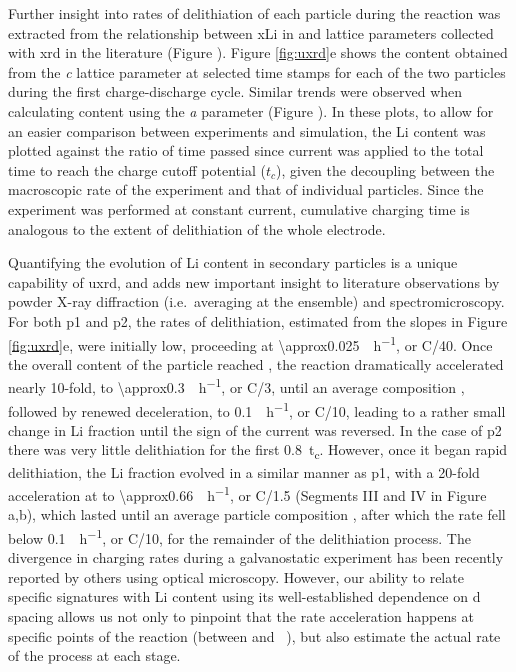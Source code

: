 \documentclass{WileyMSP-template}
\begin{document}
\newpage %
Further insight into rates of delithiation of each particle during the
reaction was extracted from the relationship between \gls{xLi} in
 and lattice parameters collected with \gls{xrd} in the
literature\cite{robert2015} (Figure ).  Figure
\ref{fig:uxrd}e shows the  content obtained from the \emph{c}
lattice parameter at selected time stamps for each of the two 
particles during the first charge-discharge cycle. Similar trends were
observed when calculating  content using the \emph{a} parameter
(Figure ). In these plots, to allow for an easier
comparison between experiments and simulation, the Li content was
plotted against the ratio of time passed since current was applied to
the total time to reach the charge cutoff potential ($t_c$), given the
decoupling between the macroscopic rate of the experiment and that of
individual particles. Since the experiment was performed at constant
current, cumulative charging time is analogous to the extent of
delithiation of the whole electrode.

Quantifying the evolution of Li content in secondary particles is a
unique capability of \gls{uxrd}, and adds new important insight to
literature observations by powder X-ray diffraction (i.e.\ averaging
at the ensemble) and
spectromicroscopy\cite{doeff2017,wolf2017,hulzen2018,ahn2017,zhou2016-2,robert2015,yoon2006,hua2018,grenier2017,chapman2020,chueh2021,
  zhao2022, rao2021, wang2020-6}. For both \gls{p1} and \gls{p2}, the
rates of delithiation, estimated from the slopes in Figure
\ref{fig:uxrd}e, were initially low, proceeding at
\SI{\approx0.025}{\per\hour}, or C/40. Once the overall content
of the particle reached , the reaction dramatically
accelerated nearly 10-fold, to \SI{\approx0.3}{\per\hour}, or
C/3, until an average composition , followed by renewed
deceleration, to \SI{0.1}{\per\hour}, or C/10, leading to a
rather small change in Li fraction until the sign of the current was
reversed. In the case of \gls{p2} there was very little delithiation
for the first \SI{0.8}{t_c}. However, once it began rapid
delithiation, the Li fraction evolved in a similar manner as \gls{p1},
with a 20-fold acceleration at  to
\SI{\approx0.66}{\per\hour}, or C/1.5 (Segments III and IV in
Figure a,b), which lasted until an average particle
composition , after which the rate fell below
\SI{0.1}{\per\hour}, or C/10, for the remainder of the
delithiation process. The divergence in charging rates during a
galvanostatic experiment has been recently reported by others using
optical microscopy\cite{zhao2022}. However, our ability to relate
specific signatures with Li content using its well-established
dependence on d spacing allows us not only to pinpoint that the rate
acceleration happens at specific points of the reaction (between
 and ~), but also estimate the actual rate of the
process at each stage.
\end{document}
